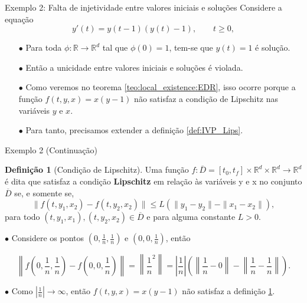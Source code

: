 \documentclass{beamer}
\newcommand{\R}{\mathbb{R}}
\theoremstyle{plain}
\theoremstyle{definition}
\newtheorem{defi}{Definição}
\begin{document}

\begin{frame}{Exemplo 2: Falta de injetividade entre valores iniciais e soluções}
        Considere a equação
        \begin{equation}
            y'(t) = y(t - 1) (y(t) - 1), \qquad t \geq 0,
            \label{chap1:ex2:eq:1}
        \end{equation}
        \begin{itemize}
            \item[$\bullet$] Para toda $\phi:\R \to \R^d$ tal que $\phi(0) = 1$, tem-se que $y(t) = 1$ é solução.
            \item[$\bullet$] Então a unicidade entre valores iniciais e soluções é violada. 
            \item[$\bullet$] Como veremos no teorema \ref{teo:local_existence:EDR}, isso ocorre porque a função $f(t, y, x) = x(y - 1)$ não satisfaz a condição de Lipschitz nas variáveis $y$ e $x$. 
            \item[$\bullet$] Para tanto, precisamos extender a definição \ref{def:IVP_Lips}.
        \end{itemize} 
\end{frame}


\begin{frame}{Exemplo 2 (Continuação)}

    \small

        \begin{defi}[Condição de Lipschitz]
            \label{def:EDR:Lips}
            Uma função $f: \overline{D} = [t_0, t_f] \times \R^d \times \R^d \to \R^d $ é dita que satisfaz a condição \textbf{Lipschitz} em relação às variáveis y e x no conjunto $\overline{D}$ se, e somente se,
            \begin{equation}
                \| f(t, y_1, x_2) - f(t, y_2, x_2) \| \leq L (\| y_1 - y_2 \| - \|x_1 - x_2\|), 
                \label{chap1:def:eq:EDR_Lips}
            \end{equation}
            para todo $(t, y_1, x_1), (t, y_2, x_2) \in \overline{D}$ e para alguma constante $L>0$.
        \end{defi}


        $\bullet$ Considere os pontos $(0, \frac{1}{n}, \frac{1}{n})$ e $(0, 0, \frac{1}{n})$, então

        \noindent
        \footnotesize
        \[
            \left\| f\left(0, \frac{1}{n}, \frac{1}{n}\right) - f\left(0, 0, \frac{1}{n}\right) \right\| =  \left\|\frac{1}{n}^2 \right\| =  \left|\frac{1}{n}\right|\left( \left\|\frac{1}{n} - 0\right\| - \left\|\frac{1}{n} - \frac{1}{n} \right\| \right).
        \]

        \normalsize
        $\bullet$ Como $|\frac{1}{n}| \to \infty$, então $f(t, y, x) = x(y-1)$ não satisfaz a definição \ref{def:EDR:Lips}.
\end{frame}
\end{document}
